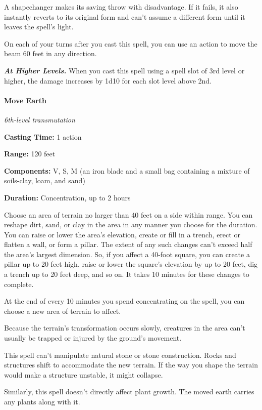 \documentclass[
]{article}
\begin{document}
A shapechanger makes its saving throw with disadvantage. If it fails, it
also instantly reverts to its original form and can't assume a different
form until it leaves the spell's light.

On each of your turns after you cast this spell, you can use an action
to move the beam 60 feet in any direction.

\emph{\textbf{At Higher Levels.}} When you cast this spell using a spell
slot of 3rd level or higher, the damage increases by 1d10 for each slot
level above 2nd.

\hypertarget{move-earth}{%
\paragraph{Move Earth}\label{move-earth}}

\emph{6th-level transmutation}

\textbf{Casting Time:} 1 action

\textbf{Range:} 120 feet

\textbf{Components:} V, S, M (an iron blade and a small bag containing a
mixture of soils-clay, loam, and sand)

\textbf{Duration:} Concentration, up to 2 hours

Choose an area of terrain no larger than 40 feet on a side within range.
You can reshape dirt, sand, or clay in the area in any manner you choose
for the duration. You can raise or lower the area's elevation, create or
fill in a trench, erect or flatten a wall, or form a pillar. The extent
of any such changes can't exceed half the area's largest dimension. So,
if you affect a 40-foot square, you can create a pillar up to 20 feet
high, raise or lower the square's elevation by up to 20 feet, dig a
trench up to 20 feet deep, and so on. It takes 10 minutes for these
changes to complete.

At the end of every 10 minutes you spend concentrating on the spell, you
can choose a new area of terrain to affect.

Because the terrain's transformation occurs slowly, creatures in the
area can't usually be trapped or injured by the ground's movement.

This spell can't manipulate natural stone or stone construction. Rocks
and structures shift to accommodate the new terrain. If the way you
shape the terrain would make a structure unstable, it might collapse.

Similarly, this spell doesn't directly affect plant growth. The moved
earth carries any plants along with it.
\end{document}
